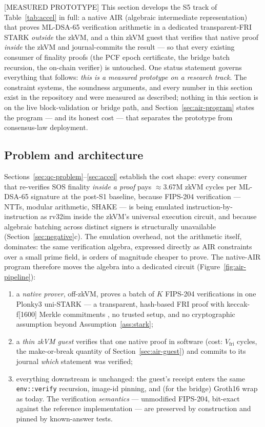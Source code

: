\documentclass[11pt]{article}
\newcommand{\code}[1]{\texttt{#1}}
\newcommand{\mldsa}{ML\mbox{-}DSA\mbox{-}65}
\newcommand{\statusM}{\textcolor{statblue}{\textsf{\scriptsize[MEASURED PROTOTYPE]}}}
\theoremstyle{plain}
\theoremstyle{definition}
\theoremstyle{remark}
\begin{document}
\statusM{} This section develops the S5 track of Table~\ref{tab:accel} in
full: a native AIR (algebraic intermediate representation) that proves
\mldsa{} verification arithmetic in a dedicated transparent-FRI STARK
\emph{outside} the zkVM, and a thin zkVM guest that verifies that native
proof \emph{inside} the zkVM and journal-commits the result --- so that
every existing consumer of finality proofs (the PCF epoch certificate, the
bridge batch recursion, the on-chain verifier) is untouched. One status
statement governs everything that follows: \emph{this is a measured
prototype on a research track}. The constraint systems, the soundness
arguments, and every number in this section exist in the repository and
were measured as described; nothing in this section is on the live
block-validation or bridge path, and Section~\ref{sec:air-program} states
the program --- and its honest cost --- that separates the prototype from
consensus-law deployment.

\subsection{Problem and architecture}
\label{sec:air-arch}

Sections~\ref{sec:qc-problem}--\ref{sec:accel} establish the cost shape:
every consumer that re-verifies SOS finality \emph{inside a proof} pays
$\approx 3.67$M zkVM cycles per \mldsa{} signature at the post-S1 baseline,
because FIPS-204 verification --- NTTs, modular arithmetic, SHAKE --- is
being emulated instruction-by-instruction as rv32im inside the zkVM's
universal execution circuit, and because algebraic batching across distinct
signers is structurally unavailable (Section~\ref{sec:negative}c). The
emulation overhead, not the arithmetic itself, dominates: the same
verification algebra, expressed directly as AIR constraints over a small
prime field, is orders of magnitude cheaper to prove. The native-AIR
program therefore moves the algebra into a dedicated circuit
(Figure~\ref{fig:air-pipeline}):

\begin{enumerate}[leftmargin=1.6em]
\item a \emph{native prover}, off-zkVM, proves a batch of $K$ FIPS-204
  verifications in one Plonky3 \cite{plonky3} uni-STARK --- a transparent,
  hash-based FRI \cite{fri2018} proof with keccak-f[1600] Merkle
  commitments \cite{fips202}, no trusted setup, and no cryptographic
  assumption beyond Assumption~\ref{ass:stark};
\item a \emph{thin zkVM guest} verifies that one native proof in software
  (cost: $V_{\mathrm{fri}}$ cycles, the make-or-break quantity of
  Section~\ref{sec:air-guest}) and commits to its journal \emph{which}
  statement was verified;
\item everything downstream is unchanged: the guest's receipt enters the
  same \code{env::verify} recursion, image-id pinning, and (for the bridge)
  Groth16 wrap as today. The verification \emph{semantics} --- unmodified
  FIPS-204, bit-exact against the reference implementation --- are
  preserved by construction and pinned by known-answer tests.
\end{enumerate}
\end{document}
